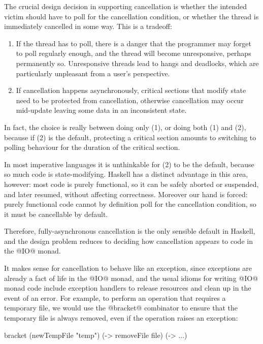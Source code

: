 The crucial design decision in supporting cancellation is whether the
intended victim should have to poll for the cancellation condition,
or whether the thread is immediately cancelled in some way.  This is a
tradeoff:

\begin{enumerate}
\item If the thread has to poll, there is a danger that the programmer
  may forget to poll regularly enough, and the thread will become
  unresponsive, perhaps permanently so.  Unresponsive threads lead to
  hangs and deadlocks, which are particularly unpleasant from a
  user's perspective.
\item If cancellation happens asynchronously, critical sections that
  modify state need to be protected from cancellation, otherwise
  cancellation may occur mid-update leaving some data in an
  inconsistent state.
\end{enumerate}

In fact, the choice is really between doing only (1), or doing both
(1) and (2), because if (2) is the default, protecting a critical
section amounts to switching to polling behaviour for the duration of
the critical section.

In most imperative languages it is unthinkable for (2) to be the
default, because so much code is state-modifying.  Haskell has a
distinct advantage in this area, however: most code is purely
functional, so it can be safely aborted or suspended, and later
resumed, without affecting correctness.  Moreover our hand is
forced: purely functional code cannot by definition poll for the
cancellation condition, so it must be cancellable by default.

Therefore, fully-asynchronous cancellation is the only sensible
default in Haskell, and the design problem reduces to deciding how
cancellation appears to code in the @IO@ monad.

It makes sense for cancellation to behave like an exception, since
exceptions are already a fact of life in the @IO@ monad, and the usual
idioms for writing @IO@ monad code include exception handlers to
release resources and clean up in the event of an error.  For example,
to perform an operation that requires a temporary file, we would use
the @bracket@ combinator to ensure that the temporary file is always
removed, even if the operation raises an exception:

\begin{haskell}
  bracket (newTempFile "temp")
          (\file -> removeFile file)
          (\file -> ...)
\end{haskell}

